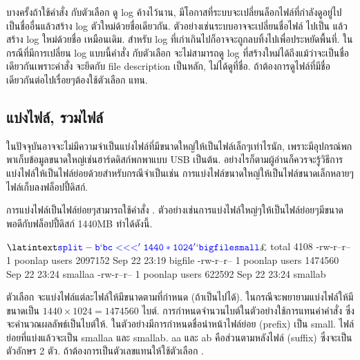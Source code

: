 \begin{thwbr}
บางครั้งถ้าใช้คำสั่ง  กับตัวเลือก  ดู log ค้างไว้นาน, มีโอกาสที่ระบบจะเปลี่ยนล็อกไฟล์ที่กำลังดูอยู่ไปเป็นชื่ออื่นแล้วสร้าง log ตัวใหม่ด้วยชื่อเดียวกัน. ตัวอย่างเช่นระบบอาจจะเปลี่ยนชื่อไฟล์  ไปเป็น  แล้วสร้าง log ใหม่ด้วยชื่อ  เหมือนเดิม. สำหรับ log ที่เก่าเกินไปก็อาจจะถูกลบทิ้งไปเพื่อประหยัดพื้นที่. ในกรณีที่มีการเปลี่ยน log แบบนี้คำสั่ง  กับตัวเลือก  จะไม่สามารถดู log ที่สร้างใหม่ได้ถึงแม้ว่าจะเป็นชื่อเดียวกันเพราะคำสั่ง  จะยึดกับ file description เป็นหลัก, ไม่ได้ดูที่ชื่อ. ถ้าต้องการดูไฟล์ที่มีชื่อเดียวกันต่อไปเรื่อยๆต้องใช้ตัวเลือก  แทน.

\subsection{แบ่งไฟล์, รวมไฟล์}
ในปัจจุบันอาจจะไม่มีความจำเป็นแบ่งไฟล์ที่มีขนาดใหญ่ให้เป็นไฟล์เล็กๆเท่าไรนัก, เพราะมีอุปกรณ์พกพาเก็บข้อมูลขนาดใหญ่เช่นฮาร์ดดิสก์พกพาแบบ USB เป็นต้น. อย่างไรก็ตามผู้อ่านก็ควรจะรู้วิธีการแบ่งไฟล์ให้เป็นไฟล์ย่อยด้วยสำหรับกรณีจำเป็นเช่น การแบ่งไฟล์ขนาดใหญ่ให้เป็นไฟล์ขนาดเล็กหลายๆไฟล์เก็บลงฟล็อปปี้ดิสก์.

การแบ่งไฟล์เป็นไฟล์ย่อยๆสามารถใช้คำสั่ง . ตัวอย่างเช่นการแบ่งไฟล์ใหญ่ๆให้เป็นไฟล์ย่อยๆมีขนาดพอดีกับฟล็อปปี้ดิสก์ 1440MB ทำได้ดังนี้.

\begin{MyExample}
\begin{MyEx}
$ \cin{split -b `bc <<<'1440*1024'` bigfile small}
$ 
total 4108
-rw-r--r--    1 poonlap  users     2097152 Sep 22 23:19 bigfile
-rw-r--r--    1 poonlap  users     1474560 Sep 22 23:24 smallaa
-rw-r--r--    1 poonlap  users      622592 Sep 22 23:24 smallab
\end{MyEx}
\end{MyExample}
ตัวเลือก  จะแบ่งไฟล์แต่ละไฟล์ให้มีขนาดตามที่กำหนด (ถ้าเป็นไปได้). ในกรณีจะพยายามแบ่งไฟล์ให้มีขนาดเป็น $1440 \times 1024 = 1474560$ ไบต์. การกำหนดจำนวนไบต์ในตัวอย่างใช้การแทนค่าคำสั่ง  ซึ่งจะคำนวณผลลัพธ์เป็นไบต์ให้. ในตัวอย่างมีการกำหนดชื่อนำหน้าไฟล์ย่อย (prefix) เป็น small. ไฟล์ย่อยที่แบ่งแล้วจะเป็น smallaa และ smallab. aa และ ab คือส่วนตามหลังไฟล์ (suffix) ซึ่งจะเป็นตัวอักษร 2 ตัว. ถ้าต้องการเป็นตัวเลขแทนให้ใช้ตัวเลือก .


\end{thwbr}
